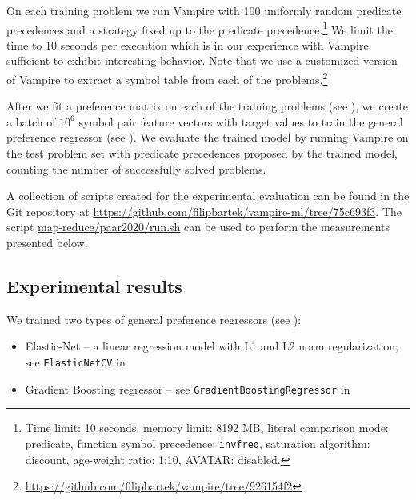 \documentclass[a4paper]{easychair}
\begin{document}
On each training problem we run %
Vampire with 100 uniformly random predicate precedences
and a strategy fixed up to the predicate precedence.\footnote{Time limit: 10 seconds, memory limit: 8192 MB, literal comparison mode: predicate, function symbol precedence: \texttt{invfreq}, saturation algorithm: discount, age-weight ratio: 1:10, AVATAR: disabled.}
We limit the time to 10 seconds per execution which is in our experience with Vampire sufficient to exhibit interesting behavior.
Note that we use a customized version of Vampire to extract a symbol table from each of the problems.\footnote{\url{https://github.com/filipbartek/vampire/tree/926154f2}}

After we fit a preference matrix on each of the training problems (see ),
we create a batch of \(10^6\) symbol pair feature vectors with target values
to train the general preference regressor (see ).
We evaluate the trained model by running Vampire on the test problem set with predicate precedences
proposed by the trained model,
counting the number of successfully solved problems.

A collection of scripts created for the experimental evaluation can be found in the Git repository at
\url{https://github.com/filipbartek/vampire-ml/tree/75c693f3}.
The script
\href{https://github.com/filipbartek/vampire-ml/blob/75c693f3/map-reduce/paar2020/run.sh}{map-reduce/paar2020/run.sh}
can be used to perform the measurements presented below.

\subsection{Experimental results}
\label{sect:experimental-results}

We trained two types of general preference regressors (see ):
\begin{itemize}
	\item Elastic-Net -- a linear regression model with L1 and L2 norm regularization; \\
	see \texttt{ElasticNetCV} in \citet{scikit-learn}
	\item Gradient Boosting regressor -- see \texttt{GradientBoostingRegressor} in \citet{scikit-learn}
\end{itemize}
\end{document}
